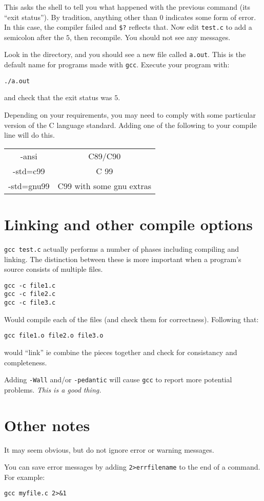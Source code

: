 This asks the shell to tell you what happened with the previous command (its ``exit status'').
By tradition, anything other than $0$ indicates some form of error.
In this case, the compiler failed and \verb!$?! reflects that.
Now edit \texttt{test.c} to add a semicolon after the $5$, then recompile.
You should not see any messages.

Look in the directory, and you should see a new file called \texttt{a.out}.
This is the default name for programs made with \texttt{gcc}.
Execute your program with:
\begin{verbatim}
./a.out 
\end{verbatim}
and check that the exit status was $5$.

Depending on your requirements, you may need to comply with some particular version of the C language standard.
Adding one of the following to your compile line will do this.

\begin{tabular}{c|c}
-ansi & C89/C90 \\
-std=c99 & C 99 \\
-std=gnu99 & C99 with some gnu extras\\
\end{tabular}


\section{Linking and other compile options}
\texttt{gcc test.c} actually performs a number of phases including compiling and linking.
The distinction between these is more important when a program's source consists of multiple 
files.
\begin{verbatim}
gcc -c file1.c
gcc -c file2.c
gcc -c file3.c
\end{verbatim}
Would compile each of the files (and check them for correctness).
Following that:
\begin{verbatim}
gcc file1.o file2.o file3.o 
\end{verbatim}
would ``link'' ie  combine the pieces together and check for consistancy and completeness.

Adding \texttt{-Wall} and/or \texttt{-pedantic} will cause \texttt{gcc} to report more potential problems.
\emph{This is a good thing.}

\section{Other notes}
It may seem obvious, but do not ignore error or warning messages.

You can save error messages by adding \verb|2>errfilename| to the end of a command.
For example:
\begin{verbatim}
gcc myfile.c 2>&1
\end{verbatim}





